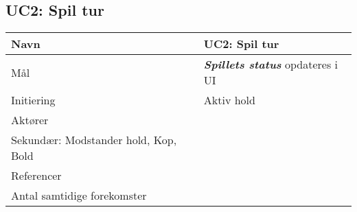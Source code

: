 \documentclass[Kravspecifikation/Kravspec_Main.tex]{subfiles}
\begin{document}
\subsection{UC2: Spil tur}

\protect\hypertarget{t.982baa266913794041029567659e3677b1ccea8f}{}{}\protect\hypertarget{t.0}{}{}

\begin{longtable}[]{@{}ll@{}}
\toprule
\toprule
\endhead
\begin{minipage}[t]{0.47\columnwidth}\raggedright
{Navn}\strut
\end{minipage} & \begin{minipage}[t]{0.47\columnwidth}\raggedright
{UC2: Spil tur}\strut
\end{minipage}\tabularnewline
\toprule
\begin{minipage}[t]{0.47\columnwidth}\raggedright
{Mål}\strut
\end{minipage} & \begin{minipage}[t]{0.47\columnwidth}\raggedright
{\textbf{\textit{Spillets status}} opdateres i UI}\strut
\end{minipage}\tabularnewline
\toprule
\begin{minipage}[t]{0.47\columnwidth}\raggedright
{Initiering}\strut
\end{minipage} & \begin{minipage}[t]{0.47\columnwidth}\raggedright
{Aktiv hold}\strut
\end{minipage}\tabularnewline
\toprule
\begin{minipage}[t]{0.47\columnwidth}\raggedright
{Aktører}\strut
\end{minipage} & \begin{minipage}[t]{0.47\columnwidth}\raggedright
{Primær: Aktiv hold \\
Sekundær: Modstander hold, Kop, Bold}\strut
\end{minipage}\tabularnewline
\toprule
\begin{minipage}[t]{0.47\columnwidth}\raggedright
{Referencer}\strut
\end{minipage} & \begin{minipage}[t]{0.47\columnwidth}\raggedright
{}\strut
\end{minipage}\tabularnewline
\toprule
\begin{minipage}[t]{0.47\columnwidth}\raggedright
{Antal samtidige forekomster}\strut
\end{minipage} & \begin{minipage}[t]{0.47\columnwidth}\raggedright

\end{minipage}
\end{longtable}
\end{document}
